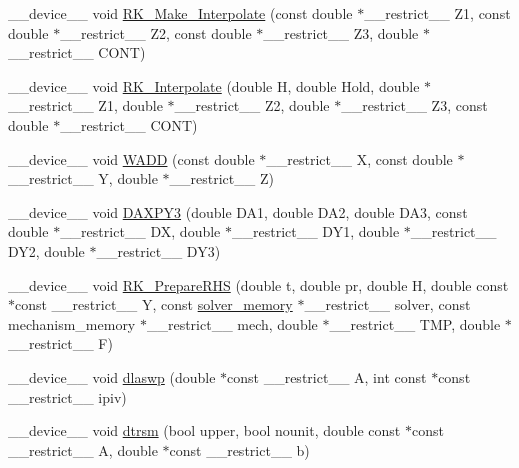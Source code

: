 \begin{DoxyCompactItemize}
\item 
\+\_\+\+\_\+device\+\_\+\+\_\+ void \hyperlink{radau2a_8cu_aae1ce6a3507f0f2afcc59b0ffab07ce0}{R\+K\+\_\+\+Make\+\_\+\+Interpolate} (const double $\ast$\+\_\+\+\_\+restrict\+\_\+\+\_\+ Z1, const double $\ast$\+\_\+\+\_\+restrict\+\_\+\+\_\+ Z2, const double $\ast$\+\_\+\+\_\+restrict\+\_\+\+\_\+ Z3, double $\ast$\+\_\+\+\_\+restrict\+\_\+\+\_\+ C\+O\+NT)
\item 
\+\_\+\+\_\+device\+\_\+\+\_\+ void \hyperlink{radau2a_8cu_ae7ef583c7c5164839e5ed7d761021679}{R\+K\+\_\+\+Interpolate} (double H, double Hold, double $\ast$\+\_\+\+\_\+restrict\+\_\+\+\_\+ Z1, double $\ast$\+\_\+\+\_\+restrict\+\_\+\+\_\+ Z2, double $\ast$\+\_\+\+\_\+restrict\+\_\+\+\_\+ Z3, const double $\ast$\+\_\+\+\_\+restrict\+\_\+\+\_\+ C\+O\+NT)
\item 
\+\_\+\+\_\+device\+\_\+\+\_\+ void \hyperlink{radau2a_8cu_aff01576484bab84fa153493d0aa0833f}{W\+A\+DD} (const double $\ast$\+\_\+\+\_\+restrict\+\_\+\+\_\+ X, const double $\ast$\+\_\+\+\_\+restrict\+\_\+\+\_\+ Y, double $\ast$\+\_\+\+\_\+restrict\+\_\+\+\_\+ Z)
\item 
\+\_\+\+\_\+device\+\_\+\+\_\+ void \hyperlink{radau2a_8cu_a99527de910c5b79e3543df52bd069a58}{D\+A\+X\+P\+Y3} (double D\+A1, double D\+A2, double D\+A3, const double $\ast$\+\_\+\+\_\+restrict\+\_\+\+\_\+ DX, double $\ast$\+\_\+\+\_\+restrict\+\_\+\+\_\+ D\+Y1, double $\ast$\+\_\+\+\_\+restrict\+\_\+\+\_\+ D\+Y2, double $\ast$\+\_\+\+\_\+restrict\+\_\+\+\_\+ D\+Y3)
\item 
\+\_\+\+\_\+device\+\_\+\+\_\+ void \hyperlink{radau2a_8cu_ad3700bc56945a6ff0b7bd7251cf86b9d}{R\+K\+\_\+\+Prepare\+R\+HS} (double t, double pr, double H, double const $\ast$const \+\_\+\+\_\+restrict\+\_\+\+\_\+ Y, const \hyperlink{structsolver__memory}{solver\+\_\+memory} $\ast$\+\_\+\+\_\+restrict\+\_\+\+\_\+ solver, const mechanism\+\_\+memory $\ast$\+\_\+\+\_\+restrict\+\_\+\+\_\+ mech, double $\ast$\+\_\+\+\_\+restrict\+\_\+\+\_\+ T\+MP, double $\ast$\+\_\+\+\_\+restrict\+\_\+\+\_\+ F)
\item 
\+\_\+\+\_\+device\+\_\+\+\_\+ void \hyperlink{radau2a_8cu_ac3aa5304e0dad88bd10863e13c287fd5}{dlaswp} (double $\ast$const \+\_\+\+\_\+restrict\+\_\+\+\_\+ A, int const $\ast$const \+\_\+\+\_\+restrict\+\_\+\+\_\+ ipiv)
\item 
\+\_\+\+\_\+device\+\_\+\+\_\+ void \hyperlink{radau2a_8cu_a8e4331dca6e7adb9838a7cd283f5d8f5}{dtrsm} (bool upper, bool nounit, double const $\ast$const \+\_\+\+\_\+restrict\+\_\+\+\_\+ A, double $\ast$const \+\_\+\+\_\+restrict\+\_\+\+\_\+ b)

\end{DoxyCompactItemize}
